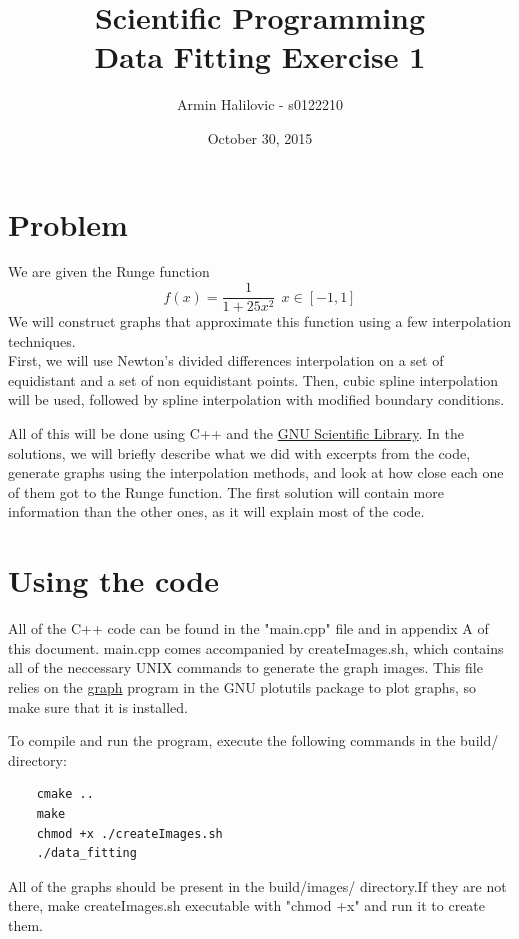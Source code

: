 \documentclass[11pt, a4paper, titlepage, openright]{article}
\title{\LARGE Scientific Programming \\ \normalsize Data Fitting Exercise 1}
\author{Armin Halilovic - s0122210}
\date{October 30, 2015}
\begin{document}

\onecolumn
\tableofcontents
\newpage



\section{Problem}
    We are given the Runge function  \[f(x) = \frac{1}{1 + 25 x^{2}} \ \ x \in [-1, 1] \]
    We will construct graphs that approximate this function using a few interpolation techniques. \\
    First, we will use Newton's divided differences interpolation on a set of equidistant and a set of non equidistant points.
    Then, cubic spline interpolation will be used, followed by spline interpolation with modified boundary conditions.

    All of this will be done using C++ and the \href{http://www.gnu.org/software/gsl/}{GNU Scientific Library}.
    In the solutions, we will briefly describe what we did with excerpts from the code, generate graphs using the interpolation methods,
    and look at how close each one of them got to the Runge function. The first solution will contain more information than
    the other ones, as it will explain most of the code.

\section{Using the code}
    All of the C++ code can be found in the "main.cpp" file and in appendix A of this document.
    main.cpp comes accompanied by createImages.sh, which contains all of the neccessary UNIX commands to generate the graph images.
    This file relies on the \href{https://www.gnu.org/software/plotutils/manual/en/html_node/graph.html}{graph} program
    in the GNU plotutils package to plot graphs, so make sure that it is installed.

    To compile and run the program, execute the following commands in the build/ directory:
    \begin{lstlisting}
    cmake ..
    make
    chmod +x ./createImages.sh
    ./data_fitting
    \end{lstlisting}
    All of the graphs should be present in the build/images/ directory.If they are not there,  make createImages.sh
    executable with "chmod +x" and run it to create them.

\newpage
\end{document}
